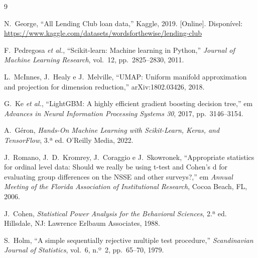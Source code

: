 \begin{thebibliography}{9}

N.~George, ``All Lending Club loan data,'' Kaggle, 2019. [Online]. Disponível:
\url{https://www.kaggle.com/datasets/wordsforthewise/lending-club}

F.~Pedregosa \textit{et al.}, ``Scikit-learn: Machine learning in Python,''
\textit{Journal of Machine Learning Research}, vol.~12, pp.~2825--2830, 2011.

L.~McInnes, J.~Healy e J.~Melville, ``UMAP: Uniform manifold approximation and projection
for dimension reduction,'' arXiv:1802.03426, 2018.

G.~Ke \textit{et al.}, ``LightGBM: A highly efficient gradient boosting decision tree,'' em
\textit{Advances in Neural Information Processing Systems 30}, 2017, pp.~3146--3154.

A.~Géron, \textit{Hands-On Machine Learning with Scikit-Learn, Keras, and TensorFlow},
3.ª ed. O'Reilly Media, 2022.

J.~Romano, J.~D.~Kromrey, J.~Coraggio e J.~Skowronek, ``Appropriate statistics for ordinal
level data: Should we really be using t-test and Cohen's d for evaluating group differences on
the NSSE and other surveys?,'' em \textit{Annual Meeting of the Florida Association of
Institutional Research}, Cocoa Beach, FL, 2006.

J.~Cohen, \textit{Statistical Power Analysis for the Behavioral Sciences}, 2.ª ed. Hillsdale,
NJ: Lawrence Erlbaum Associates, 1988.

S.~Holm, ``A simple sequentially rejective multiple test procedure,'' \textit{Scandinavian
Journal of Statistics}, vol.~6, n.º~2, pp.~65--70, 1979.

\end{thebibliography}
